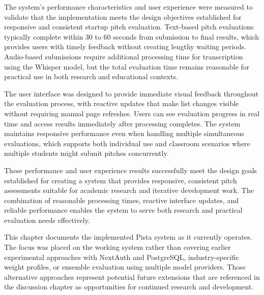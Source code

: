 The system's performance characteristics and user experience were measured to validate that the implementation meets the design objectives established for responsive and consistent startup pitch evaluation. Text-based pitch evaluations typically complete within 30 to 60 seconds from submission to final results, which provides users with timely feedback without creating lengthy waiting periods. Audio-based submissions require additional processing time for transcription using the Whisper model, but the total evaluation time remains reasonable for practical use in both research and educational contexts.

The user interface was designed to provide immediate visual feedback throughout the evaluation process, with reactive updates that make list changes visible without requiring manual page refreshes. Users can see evaluation progress in real time and access results immediately after processing completes. The system maintains responsive performance even when handling multiple simultaneous evaluations, which supports both individual use and classroom scenarios where multiple students might submit pitches concurrently.

These performance and user experience results successfully meet the design goals established for creating a system that provides responsive, consistent pitch assessments suitable for academic research and iterative development work. The combination of reasonable processing times, reactive interface updates, and reliable performance enables the system to serve both research and practical evaluation needs effectively.

This chapter documents the implemented Pista system as it currently operates. The focus was placed on the working system rather than covering earlier experimental approaches with NextAuth and PostgreSQL, industry-specific weight profiles, or ensemble evaluation using multiple model providers. Those alternative approaches represent potential future extensions that are referenced in the discussion chapter as opportunities for continued research and development.
